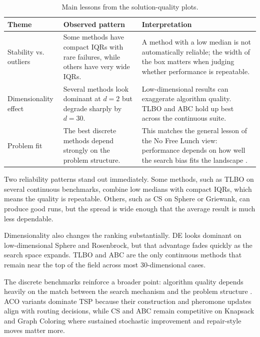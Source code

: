 \begin{table}[H]
    \centering
    \small
    \begin{tabular}{|p{}|p{}|p{}|}
        \hline
        \textbf{Theme} & \textbf{Observed pattern} & \textbf{Interpretation} \\
        \hline
        Stability vs. outliers & Some methods have compact IQRs with rare failures, while others have very wide IQRs. & A method with a low median is not automatically reliable; the width of the box matters when judging whether performance is repeatable. \\
        \hline
        Dimensionality effect & Several methods look dominant at $d=2$ but degrade sharply by $d=30$. & Low-dimensional results can exaggerate algorithm quality. TLBO and ABC hold up best across the continuous suite. \\
        \hline
        Problem fit & The best discrete methods depend strongly on the problem structure. & This matches the general lesson of the No Free Lunch view: performance depends on how well the search bias fits the landscape \autocite{WolpertMacready1997}. \\
        \hline
    \end{tabular}
    \caption{Main lessons from the solution-quality plots.}
    \label{tab:quality-discussion-summary}
\end{table}

Two reliability patterns stand out immediately. Some methods, such as TLBO on several continuous benchmarks, combine low medians with compact IQRs, which means the quality is repeatable. Others, such as CS on Sphere or Griewank, can produce good runs, but the spread is wide enough that the average result is much less dependable.

Dimensionality also changes the ranking substantially. DE looks dominant on low-dimensional Sphere and Rosenbrock, but that advantage fades quickly as the search space expands. TLBO and ABC are the only continuous methods that remain near the top of the field across most 30-dimensional cases.

The discrete benchmarks reinforce a broader point: algorithm quality depends heavily on the match between the search mechanism and the problem structure \autocite{WolpertMacready1997}. ACO variants dominate TSP because their construction and pheromone updates align with routing decisions, while CS and ABC remain competitive on Knapsack and Graph Coloring where sustained stochastic improvement and repair-style moves matter more.